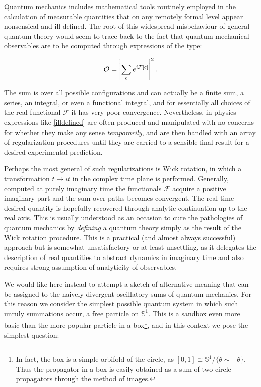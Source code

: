 \documentclass{article}
\begin{document}
Quantum mechanics includes mathematical tools routinely employed in the calculation of measurable quantities that on any remotely formal level appear nonsensical and ill-defined. The root of this widespread misbehaviour of general quantum theory would seem to trace back to the fact that quantum-mechanical observables are to be computed through expressions of the type:

\begin{equation}\label{illdefined}
    \mathcal{O} = \abs{ \sum_{c} e^{i\mathcal{F}[c]} }^2\,.
\end{equation}

The sum is over all possible configurations and can actually be a finite sum, a series, an integral, or even a functional integral, and for essentially all choices of the real functional $\mathcal{F}$ it has very poor convergence. Nevertheless, in physics expressions like \eqref{illdefined} are often produced and manipulated with no concerns for whether they make any sense \emph{temporarily}, and are then handled with an array of regularization procedures until they are carried to a sensible final result for a desired experimental prediction.

Perhaps the most general of such regularizations is Wick rotation, in which a transformation $t \rightarrow it$ in the complex time plane is performed. Generally, computed at purely imaginary time the functionals $\mathcal{F}$ acquire a positive imaginary part and the sum-over-paths becomes convergent. The real-time desired quantity is hopefully recovered through analytic continuation up to the real axis. This is usually understood as an occasion to cure the pathologies of quantum mechanics by \emph{defining} a quantum theory simply as the result of the Wick rotation procedure. This is a practical (and almost always successful) approach but is somewhat unsatisfactory or at least unsettling, as it delegates the description of real quantities to abstract dynamics in imaginary time and also requires strong assumption of analyticity of observables.

We would like here instead to attempt a sketch of alternative meaning that can be assigned to the naively divergent oscillatory sums of quantum mechanics. For this reason we consider the simplest possible quantum system in which such unruly summations occur, a free particle on $\mathbb{S}^1$. This is a sandbox even more basic than the more popular particle in a box\footnote{In fact, the box is a simple orbifold of the circle, as $[0,1] \cong \mathbb{S}^1/\{\theta \sim - \theta\}$. Thus the propagator in a box is easily obtained as a sum of two circle propagators through the method of images.}, and in this context we pose the simplest question:
\end{document}
